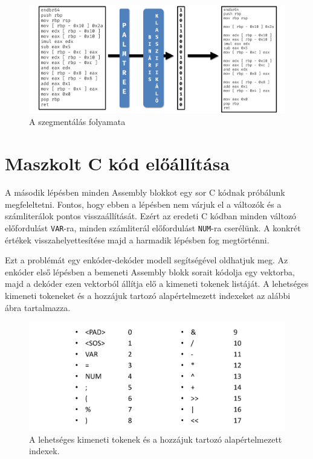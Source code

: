 \begin{figure}[H]
	\centering
	\includegraphics[width=1\textwidth]{images/segmentation_fig.pdf}
	\caption{A szegmentálás folyamata}
	\label{fig:segmentation_fig}
\end{figure}

\section{Maszkolt C kód előállítása}
A második lépésben minden Assembly blokkot egy sor C kódnak próbálunk
megfeleltetni. Fontos, hogy ebben a lépésben nem várjuk el a változók és
a számliterálok pontos visszaállítását. Ezért az eredeti C kódban minden
változó előfordulást \texttt{VAR}-ra, minden számliterál előfordulást
\texttt{NUM}-ra cserélünk. A konkrét értékek visszahelyettesítése majd
a harmadik lépésben fog megtörténni.

Ezt a problémát egy enkóder-dekóder modell segítségével oldhatjuk meg. Az enkóder
első lépésben a bemeneti Assembly blokk sorait kódolja egy vektorba, majd
a dekóder ezen vektorból állítja elő a kimeneti tokenek listáját. A lehetséges
kimeneti tokeneket és a hozzájuk tartozó alapértelmezett indexeket az alábbi ábra
tartalmazza.

\begin{figure}[H]
	\centering
	\includegraphics[width=1\textwidth,frame]{images/tokens.pdf}
	\caption{A lehetséges kimeneti tokenek és a hozzájuk tartozó alapértelmezett indexek.}
	\label{fig:tokens}
\end{figure}

